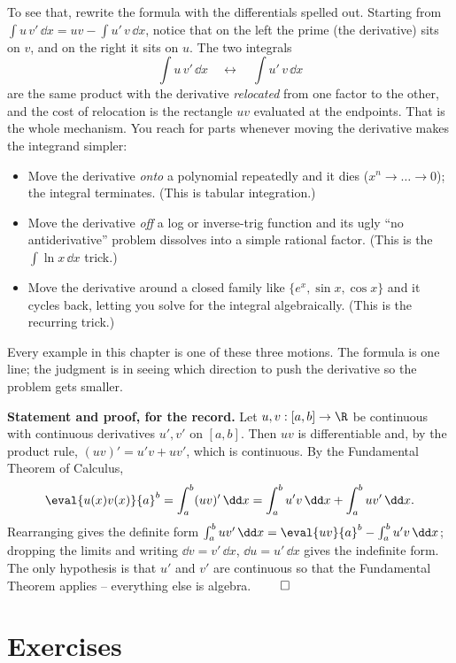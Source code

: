 To see that, rewrite the formula with the differentials spelled out. Starting
from $\int u\,v'\,\dd x = uv - \int u'\,v\,\dd x$, notice that on the left the
prime (the derivative) sits on $v$, and on the right it sits on $u$. The two
integrals
\[
\int u\,v'\,\dd x \quad\longleftrightarrow\quad \int u'\,v\,\dd x
\]
are the same product with the derivative \emph{relocated} from one factor to the
other, and the cost of relocation is the rectangle $uv$ evaluated at the
endpoints. That is the whole mechanism. You reach for parts whenever moving the
derivative makes the integrand simpler:
\begin{itemize}
\item Move the derivative \emph{onto} a polynomial repeatedly and it dies
($x^n \to \dots \to 0$); the integral terminates. (This is tabular integration.)
\item Move the derivative \emph{off} a log or inverse-trig function and its ugly
``no antiderivative'' problem dissolves into a simple rational factor. (This is
the $\int\ln x\,\dd x$ trick.)
\item Move the derivative around a closed family like $\{e^x,\sin x,\cos x\}$ and
it cycles back, letting you solve for the integral algebraically. (This is the
recurring trick.)
\end{itemize}
Every example in this chapter is one of these three motions. The formula is one
line; the judgment is in seeing which direction to push the derivative so the
problem gets smaller.

\begin{formalbox}
\textbf{Statement and proof, for the record.} Let $u,v:[a,b]\to\R$ be continuous
with continuous derivatives $u',v'$ on $[a,b]$. Then $uv$ is differentiable and,
by the product rule, $(uv)' = u'v + uv'$, which is continuous. By the Fundamental
Theorem of Calculus,
\[
\eval{u(x)v(x)}{a}^{b} = \int_a^b (uv)'\,\dd x = \int_a^b u'v\,\dd x + \int_a^b uv'\,\dd x.
\]
Rearranging gives the definite form
$\int_a^b uv'\,\dd x = \eval{uv}{a}^{b} - \int_a^b u'v\,\dd x$; dropping the
limits and writing $\dd v = v'\,\dd x$, $\dd u = u'\,\dd x$ gives the indefinite
form. The only hypothesis is that $u'$ and $v'$ are continuous so that the
Fundamental Theorem applies -- everything else is algebra. $\qed$
\end{formalbox}

\section*{Exercises}

